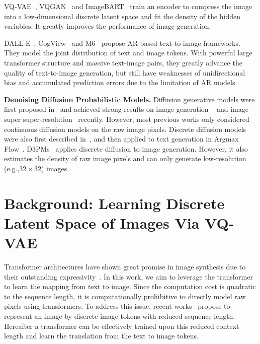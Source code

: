 VQ-VAE~\cite{oord2017neural,razavi2019generating}, VQGAN~\cite{esser2021taming} and ImageBART~\cite{esser2021imagebart} train an encoder to compress the image into a low-dimensional discrete latent space and fit the density of the hidden variables. It greatly improves the performance of image generation. 

DALL-E~\cite{ramesh2021zero}, CogView~\cite{ding2021cogview} and M6~\cite{lin2021m6} propose AR-based text-to-image frameworks. They model the joint distribution of text and image tokens. With powerful large transformer structure and massive text-image pairs, they greatly advance the quality of text-to-image generation, but still have weaknesses of unidirectional bias and accumulated prediction errors due to the limitation of AR models.

 \textbf{Denoising Diffusion Probabilistic Models.} Diffusion generative models were first proposed in~\cite{sohl2015deep} and achieved strong results on image generation ~\cite{ho2020denoising,nichol2021improved,ho2021cascaded,dhariwal2021diffusion} and image super super-resolution~\cite{saharia2021image} recently. However, most previous works only considered continuous diffusion models on the raw image pixels. Discrete diffusion models were also first described in~\cite{sohl2015deep}, and then applied to text generation in Argmax Flow~\cite{hoogeboom2021argmax}. D3PMs~\cite{austin2021structured} applies discrete diffusion to image generation. However, it also estimates the density of raw image pixels and can only generate low-resolution (e.g.,$32 \times 32$) images. 

\section{Background: Learning Discrete Latent Space of Images Via VQ-VAE} Transformer architectures have shown great promise in image synthesis due to their outstanding expressivity~\cite{chen2020generative,esser2021taming,ramesh2021zero}. In this work, we aim to leverage the transformer to learn the mapping from text to image. Since the computation cost is quadratic to the sequence length, it is computationally prohibitive to directly model raw pixels using transformers. To address this issue, recent works~\cite{oord2017neural,esser2021taming} propose to represent an image by discrete image tokens with reduced sequence length. Hereafter a transformer can be effectively trained upon this reduced context length and learn the translation from the text to image tokens. 

